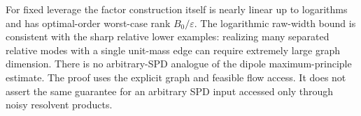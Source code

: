 For fixed leverage the factor construction itself is nearly linear
up to logarithms and has optimal-order worst-case rank $B_0/\varepsilon$.
The logarithmic raw-width bound is consistent with the sharp relative
lower examples: realizing many separated relative modes with a single
unit-mass edge can require extremely large graph dimension. There is
no arbitrary-SPD analogue of the dipole maximum-principle estimate.
The proof uses the explicit graph and feasible flow access. It does not
assert the same guarantee for an arbitrary SPD input accessed only through
noisy resolvent products.

